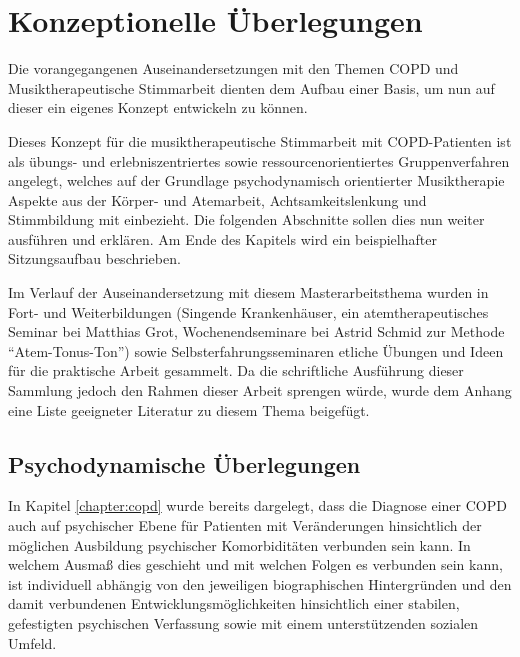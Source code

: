 \ifpdf
    \graphicspath{{4_konzept/figures/PNG/}{4_konzept/figures/PDF/}{4_konzept/figures/}}
\else
    \graphicspath{{4_konzept/figures/EPS/}{4_konzept/figures/}}
\fi

\chapter{Konzeptionelle \"Uberlegungen}
\label{chapter:konzeptionelle_ueberlegungen}
Die vorangegangenen Auseinandersetzungen mit den Themen COPD und Musiktherapeutische Stimmarbeit dienten dem Aufbau einer Basis, um nun auf dieser ein eigenes Konzept entwickeln zu können. 

Dieses Konzept für die musiktherapeutische Stimmarbeit mit COPD-Patienten ist als übungs- und erlebniszentriertes sowie ressourcenorientiertes Gruppenverfahren angelegt, welches auf der Grundlage psychodynamisch orientierter Musiktherapie Aspekte aus der Körper- und Atemarbeit, Achtsamkeitslenkung und Stimmbildung mit einbezieht. Die folgenden Abschnitte sollen dies nun weiter ausführen und erklären. Am Ende des Kapitels wird ein beispielhafter Sitzungsaufbau beschrieben. %

Im Verlauf der Auseinandersetzung mit diesem Masterarbeitsthema wurden in Fort- und Weiterbildungen (Singende Krankenhäuser, ein atemtherapeutisches Seminar bei Matthias Grot, Wochenendseminare bei Astrid Schmid zur Methode "`Atem-Tonus-Ton"') sowie Selbsterfahrungsseminaren etliche Übungen und Ideen für die praktische Arbeit gesammelt. Da die schriftliche Ausführung dieser Sammlung jedoch den Rahmen dieser Arbeit sprengen würde, wurde dem Anhang eine Liste geeigneter Literatur zu diesem Thema beigefügt.

\section{Psychodynamische \"Uberlegungen}
\label{psychodynamische_ueberlegungen}
In Kapitel \ref{chapter:copd} wurde bereits dargelegt, dass die Diagnose einer COPD auch auf psychischer Ebene für Patienten mit Veränderungen hinsichtlich der möglichen Ausbildung psychischer Komorbiditäten verbunden sein kann. In welchem Ausmaß dies geschieht und mit welchen Folgen es verbunden sein kann, ist individuell abhängig von den jeweiligen biographischen Hintergründen und den damit verbundenen Entwicklungsmöglichkeiten hinsichtlich einer stabilen, gefestigten psychischen Verfassung sowie mit einem unterstützenden sozialen Umfeld.

